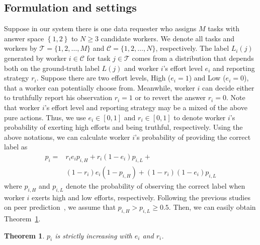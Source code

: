 \documentclass{article}
\newtheorem{theorem}{Theorem}
\begin{document}
\subsection{Formulation and settings}
Suppose in our system there is one data requester who assigns $M$ tasks with answer space $\left\{1,2\right\}$ to $N \geq 3$ candidate workers.
We denote all tasks and workers by $\mathcal{T}=\{1,2,\ldots,M\}$ and $\mathcal{C}=\{1,2,\ldots,N\}$, respectively.
The label $L_{i}(j)$ generated by worker $i\in \mathcal{C}$ for task $j\in\mathcal{T}$ comes from a distribution that depends both on the ground-truth label $L(j)$ and worker $i$'s effort level $e_i$ and reporting strategy $r_i$.
Suppose there are two effort levels, High ($e_i=1$) and Low ($e_i=0$), that a worker can potentially choose from.
Meanwhile, worker $i$ can decide either to truthfully report his observation $r_i = 1$ or to revert the answer $r_i = 0$.
Note that worker $i$'s effort level and reporting strategy may be a mixed of the above pure actions.
Thus, we use $e_i\in[0,1]$ and $r_i\in[0,1]$ to denote worker $i$'s probability of exerting high efforts and being truthful, respectively.
Using the above notations, we can calculate worker $i$'s probability of providing the correct label as
\begin{equation}
\begin{split}
p_i=&r_i e_i p_{i, H}+r_i (1-e_i) p_{i, L}+\\
&(1-r_i) e_i (1-p_{i, H})+(1-r_i) (1-e_i) p_{i, L}
\end{split}
\end{equation}
where $p_{i, H}$ and $p_{i, L}$ denote the probability of observing the correct label when worker $i$ exerts high and low efforts, respectively.
Following the previous studies on peer prediction~\cite{dasgupta2013crowdsourced}, we assume that $p_{i, H}>p_{i, L}\geq 0.5$.
Then, we can easily obtain Theorem~\ref{Incre}.
\begin{theorem}
\label{Incre}
$p_i$ is strictly increasing with $e_i$ and $r_i$.  
\end{theorem}
\end{document}
